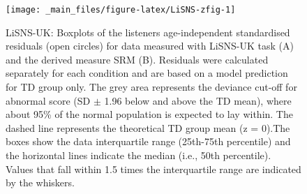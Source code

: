 \documentclass[a4paper, twoside]{templates/ociamthesis}
\begin{document}
\begin{figure}

{\centering \texttt{[image: \_main\_files/figure-latex/LiSNS-zfig-1]} 

}

\caption{LiSNS-UK: Boxplots of the listeners age-independent standardised residuals (open circles) for data measured with LiSNS-UK task (A) and the derived measure SRM (B). Residuals were calculated separately for each condition and are based on a model prediction for TD group only. The grey area represents the deviance cut-off for abnormal score (SD $\pm$ 1.96 below and above the TD mean), where about 95\% of the normal population is expected to lay within. The dashed line represents the theoretical TD group mean (z = 0).The boxes show the data interquartile range (25th-75th percentile) and the horizontal lines indicate the median (i.e., 50th percentile). Values that fall within 1.5 times the interquartile range are indicated by the whiskers.}\label{fig:LiSNS-zfig}
\end{figure}

\begin{table}

\caption{\label{tab:LiSNS-ztab}LiSNS-UK standard residuals (z-scores) descriptives by group. abnormal: defined as the percentage of abnormal z-score $>$ 1.96 (SSN, S0N0, \& S0N90) and z-score $<$ 1.96 (SRM).}
\centering
{}
\end{table}
\end{document}
